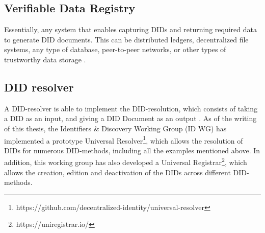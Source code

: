 



\subsection{Verifiable Data Registry}

Essentially, any system that enables capturing DIDs and returning required data to generate DID documents. This can be distributed ledgers, decentralized file systems, any type of database, peer-to-peer networks, or other types of trustworthy data storage \cite{sporny_longley_sabadello_reed_steele_2021}.

\subsection{DID resolver}

A DID-resolver is able to implement the DID-resolution, which consists of taking a DID as an input, and giving a DID Document as an output \cite{sporny_longley_sabadello_reed_steele_2021}. As of the writing of this thesis, the Identifiers \& Discovery Working Group (ID WG) has implemented a prototype Universal Resolver\footnote{https://github.com/decentralized-identity/universal-resolver}, which allows the resolution of DIDs for numerous DID-methods, including all the examples mentioned above. In addition, this working group has also developed a Universal Registrar\footnote{https://uniregistrar.io/}, which allows the creation, edition and deactivation of the DIDs across different DID-methods.

